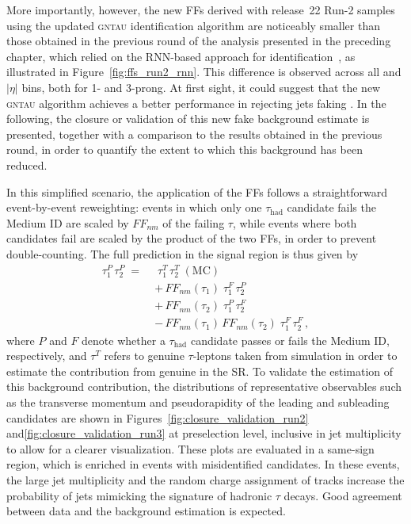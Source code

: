 More importantly, however, the new FFs derived with release~22 Run-2 samples using the updated \textsc{gntau} identification algorithm are noticeably smaller than those obtained in the previous round of the analysis presented in the preceding chapter, which relied on the RNN-based approach for \tauhad identification~\cite{serhat_tesis}, as illustrated in Figure~\ref{fig:ffs_run2_rnn}.  
This difference is observed across all \pt and $|\eta|$ bins, both for 1- and 3-prong. At first sight, it could suggest that the new \textsc{gntau} algorithm achieves a better performance in rejecting jets faking \tauhad. In the following, the closure or validation of this new fake \tauhad background estimate is presented, together with a comparison to the results obtained in the previous round, in order to quantify the extent to which this background has been reduced.

In this simplified scenario, the application of the FFs follows a straightforward event-by-event reweighting: events in which only one $\tau_{\mathrm{had}}$ candidate fails the Medium ID are scaled by $FF_{nm}$ of the failing $\tau$, while events where both candidates fail are scaled by the product of the two FFs, in order to prevent double-counting. The full prediction in the signal region is thus given by
\begin{align}
    \tau_1^{P}\,\tau_2^{P} \;=\;&\;
    \tau_1^{T}\,\tau_2^{T}\;(\text{MC}) \nonumber \\[0.2cm]
    &+\, FF_{nm}(\tau_1)\;\tau_1^{F}\,\tau_2^{P} \nonumber \\[0.2cm]
    &+\, FF_{nm}(\tau_2)\;\tau_1^{P}\,\tau_2^{F} \nonumber \\[0.2cm]
    &-\, FF_{nm}(\tau_1)\,FF_{nm}(\tau_2)\;\tau_1^{F}\,\tau_2^{F}\,,
    \label{eq_fakes}
    \end{align}
where $P$ and $F$ denote whether a $\tau_{\mathrm{had}}$ candidate passes or fails the Medium ID, respectively, and $\tau^T$ refers to genuine $\tau$-leptons taken from simulation in order to estimate the contribution from genuine \tauhad in the SR.  
To validate the estimation of this background contribution, the distributions of representative observables such as the transverse momentum and pseudorapidity of the leading and subleading \tauhad candidates are shown in Figures~\ref{fig:closure_validation_run2} and\ref{fig:closure_validation_run3} at preselection level, inclusive in jet multiplicity to allow for a clearer visualization.  
These plots are evaluated in a same-sign region, which is enriched in events with misidentified \tauhad candidates. In these events, the large jet multiplicity and the random charge assignment of tracks increase the probability of jets mimicking the signature of hadronic $\tau$ decays. Good agreement between data and the background estimation is expected. 
    
